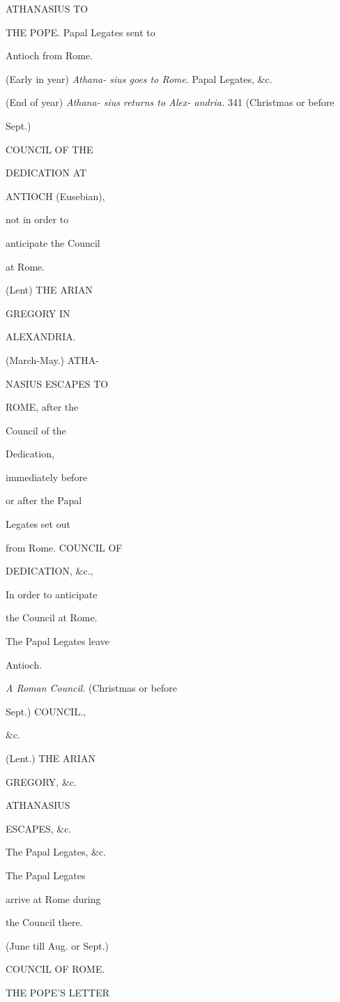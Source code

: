 ATHANASIUS TO

THE POPE.
Papal Legates sent to

Antioch from Rome.

(Early in year) \emph{Athana- sius goes to Rome}.
Papal Legates, \&c.

(End of year) \emph{Athana- sius returns to Alex- andria.} 341
(Christmas or before

Sept.)

COUNCIL OF THE

DEDICATION AT

ANTIOCH (Eusebian),

not in order to

anticipate the Council

at Rome.

(Lent) THE ARIAN

GREGORY IN

ALEXANDRIA.

(March-May.) ATHA-

NASIUS ESCAPES TO

ROME, after the

Council of the

Dedication,

immediately before

or after the Papal

Legates set out

from Rome.
COUNCIL OF

DEDICATION, \&c.,

In order to anticipate

the Council at Rome.

The Papal Legates leave

Antioch.

\emph{A Roman Council}.
(Christmas or before

Sept.) COUNCIL.,

\&c.

(Lent.) THE ARIAN

GREGORY, \&c.

ATHANASIUS

ESCAPES, \&c.

The Papal Legates, \&c.

The Papal Legates

arrive at Rome during

the Council there.

(June till Aug. or Sept.)

COUNCIL OF ROME.

THE POPE'S
LETTER

